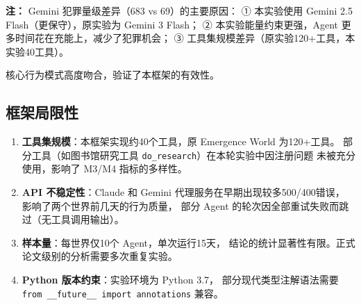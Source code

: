 \noindent\textbf{注：} Gemini 犯罪量级差异（683 vs 69）的主要原因：
① 本实验使用 Gemini 2.5 Flash（更保守），原实验为 Gemini 3 Flash；
② 本实验能量约束更强，Agent 更多时间花在充能上，减少了犯罪机会；
③ 工具集规模差异（原实验120+工具，本实验40工具）。

核心行为模式高度吻合，验证了本框架的有效性。

\subsection{框架局限性}

\begin{enumerate}
  \item \textbf{工具集规模}：本框架实现约40个工具，原 Emergence World 为120+工具。
        部分工具（如图书馆研究工具 \texttt{do\_research}）在本轮实验中因注册问题
        未被充分使用，影响了 M3/M4 指标的多样性。

  \item \textbf{API 不稳定性}：Claude 和 Gemini 代理服务在早期出现较多500/400错误，
        影响了两个世界前几天的行为质量，
        部分 Agent 的轮次因全部重试失败而跳过（无工具调用输出）。

  \item \textbf{样本量}：每世界仅10个 Agent，单次运行15天，
        结论的统计显著性有限。正式论文级别的分析需要多次重复实验。

  \item \textbf{Python 版本约束}：实验环境为 Python 3.7，
        部分现代类型注解语法需要 \texttt{from \_\_future\_\_ import annotations} 兼容。
\end{enumerate}
